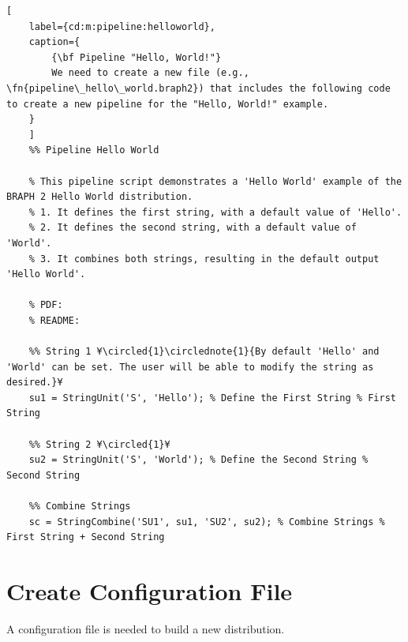\documentclass{tufte-handout}
\begin{document}
\begin{lstlisting}[
	label={cd:m:pipeline:helloworld},
	caption={
		{\bf Pipeline "Hello, World!"}
		We need to create a new file (e.g., \fn{pipeline\_hello\_world.braph2}) that includes the following code to create a new pipeline for the "Hello, World!" example.
	}
	]
	%% Pipeline Hello World

	% This pipeline script demonstrates a 'Hello World' example of the BRAPH 2 Hello World distribution.
	% 1. It defines the first string, with a default value of 'Hello'.
	% 2. It defines the second string, with a default value of 'World'.
	% 3. It combines both strings, resulting in the default output 'Hello World'.
	
	% PDF: 
	% README: 
	
	%% String 1 ¥\circled{1}\circlednote{1}{By default 'Hello' and 'World' can be set. The user will be able to modify the string as desired.}¥
	su1 = StringUnit('S', 'Hello'); % Define the First String % First String
	
	%% String 2 ¥\circled{1}¥
	su2 = StringUnit('S', 'World'); % Define the Second String % Second String
	
	%% Combine Strings
	sc = StringCombine('SU1', su1, 'SU2', su2); % Combine Strings % First String + Second String
\end{lstlisting}

\clearpage
\section{Create Configuration File}

A configuration file is needed to build a new distribution.
\end{document}
